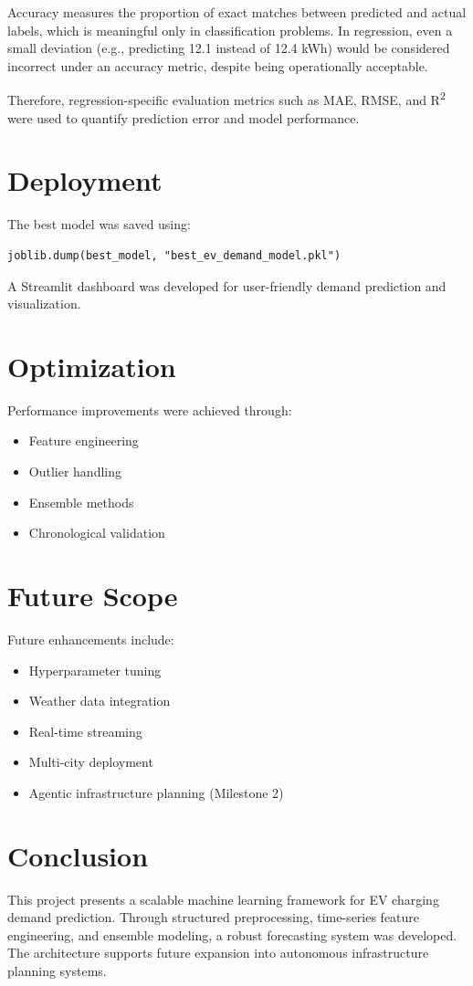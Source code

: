 \documentclass[12pt,a4paper]{article}
\begin{document}
Accuracy measures the proportion of exact matches between predicted and actual labels, which is meaningful only in classification problems. 
In regression, even a small deviation (e.g., predicting 12.1 instead of 12.4 kWh) would be considered incorrect under an accuracy metric, despite being operationally acceptable.

Therefore, regression-specific evaluation metrics such as MAE, RMSE, and R\textsuperscript{2} were used to quantify prediction error and model performance.

\section{Deployment}

The best model was saved using:

\begin{verbatim}
joblib.dump(best_model, "best_ev_demand_model.pkl")
\end{verbatim}

A Streamlit dashboard was developed for user-friendly demand prediction and visualization.

\section{Optimization}

Performance improvements were achieved through:

\begin{itemize}
    \item Feature engineering
    \item Outlier handling
    \item Ensemble methods
    \item Chronological validation
\end{itemize}

\section{Future Scope}

Future enhancements include:

\begin{itemize}
    \item Hyperparameter tuning
    \item Weather data integration
    \item Real-time streaming
    \item Multi-city deployment
    \item Agentic infrastructure planning (Milestone 2)
\end{itemize}

\section{Conclusion}

This project presents a scalable machine learning framework for EV charging demand prediction. 
Through structured preprocessing, time-series feature engineering, and ensemble modeling, a robust forecasting system was developed. 
The architecture supports future expansion into autonomous infrastructure planning systems.
\end{document}
